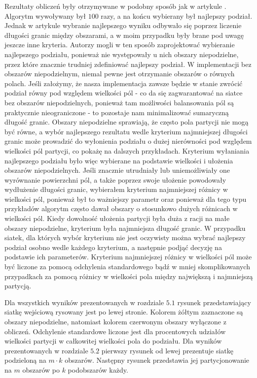 Rezultaty obliczeń były otrzymywane w podobny sposób jak w artykule \cite{1364754}.
Algorytm wywoływany był $100$ razy, a na końcu wybierany był najlepszy podział.
Jednak w artykule \cite{1364754} wybranie najlepszego wyniku odbywało się poprzez liczenie długości granic między obszarami,
a w moim przypadku były brane pod uwagę jeszcze inne kryteria.
Autorzy \cite{1364754} mogli w ten sposób zaprojektować wybieranie najlepszego podziału, ponieważ nie występowały u nich
obszary niepodzielne, przez które znacznie trudniej zdefiniować najlepszy podział.
W implementacji bez obszarów niepodzielnym, niemal pewne jest otrzymanie obszarów o równych polach.
Jeśli założymy, że nasza implementacja zawsze będzie w stanie zwrócić podział równy pod względem wielkości pól -
co da się zagwarantować na siatce bez obszarów niepodzielnych, ponieważ tam możliwości balansowania
pól są praktycznie nieograniczone - to pozostaje nam minimalizować sumaryczną długość granic.
Obszary niepodzielne sprawiają, że często pola partycji nie mogą być równe, a wybór najlepszego rezultatu wedle
kryterium najmniejszej długości granic może
prowadzić do wyłonienia podziału o dużej nierówności pod względem wielkości pól partycji, co pokażę na dalszych przykładach.
Kryterium wyłaniania najlepszego podziału było więc wybierane na podstawie wielkości i ułożenia obszarów niepodzielnych.
Jeśli znacznie utrudniały lub uniemożliwiały one wyrównanie powierzchni pól, a także poprzez swoje ułożenie powodowały wydłużenie długości granic,
wybierałem kryterium najmniejszej różnicy w wielkości pól, ponieważ był to ważniejszy parametr oraz
ponieważ dla tego typu przykładów algorytm często dawał obszary o stosunkowo dużych różnicach w wielkości pól.
Kiedy dowolność ułożenia partycji była duża z racji na małe obszary niepodzielne, kryterium była najmniejsza długość granic.
W przypadku siatek, dla których wybór kryterium nie jest oczywisty można wybrać najlepszy podział osobno wedle każdego kryterium,
a następnie podjąć decyzję na podstawie ich parameterów.
Kryterium najmniejszej różnicy w wielkości pól może być liczone za pomocą odchylenia standardowego bądź w mniej
skomplikowanych przypadkach
za pomocą różnicy w wielkości pola między największą i najmniejszą partycją.

Dla wszystkich wyników prezentowanych w rozdziale $5.1$ rysunek przedstawiający siatkę wejściową rysowany jest po lewej stronie.
Kolorem żółtym zaznaczone są obszary niepodzielne, natomiast kolorem czerwonym obszary wyłączone z obliczeń.
Odchylenie standardowe liczone jest dla procentowych udziałów wielkości partycji w całkowitej wielkości pola do podziału.
Dla wyników prezentowanych w rozdziale $5.2$ pierwszy rysunek od lewej prezentuje siatkę podzieloną na $m \cdot k$ obszarów.
Następny rysunek przedstawia jej partycjonowanie na $m$ obszarów po $k$ podobszarów każdy.
\vspace{-5mm}